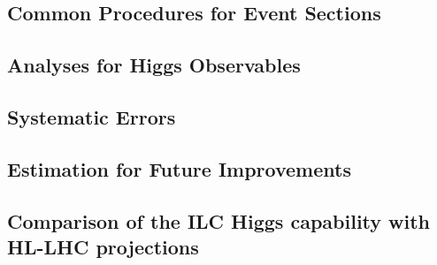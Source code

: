 


\subsection{Common Procedures for Event Sections}
\label{subsec:higgs_common}



\subsection{Analyses for Higgs Observables}


% 

% 

\subsection{Systematic Errors}



\subsection{Estimation for Future Improvements}



\subsection{Comparison of the ILC Higgs capability with 
HL-LHC projections}
\label{subsec:higgs_lhcilc}



